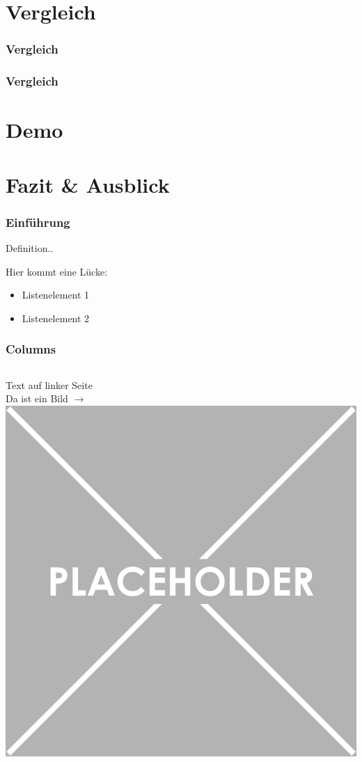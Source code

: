 \documentclass[xcolor=dvipsnames]{beamer}
\begin{document}
\section{Vergleich}
\begin{frame}\frametitle{Vergleich}
\end{frame}

\begin{frame}\frametitle{Vergleich}
\end{frame}

\section{Demo}
\section{Fazit \& Ausblick}

\begin{frame}
	\frametitle{Einführung}
	\begin{Definition}
		Definition..
	\end{Definition}
	Hier kommt eine Lücke:
	\vspace{4ex}
	\begin{itemize}
		\item Listenelement 1
		\item Listenelement 2
	\end{itemize}
\end{frame}

\frame{\tableofcontents[current]}

\begin{frame}\frametitle{Columns}
	\begin{columns}[t,onlytextwidth]
			Text auf linker Seite\\
			Da ist ein Bild $\rightarrow$
		\centering
		\includegraphics[width=1.0\textwidth,valign=t]{pictures/placeholder}
	\end{columns}
\end{frame}
\end{document}
